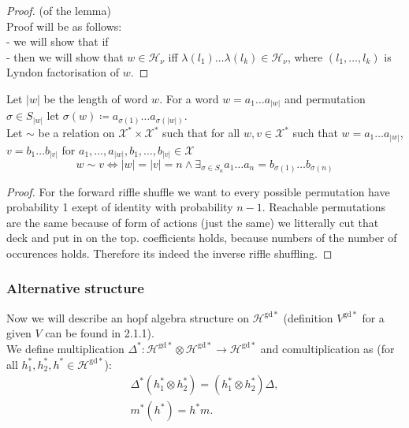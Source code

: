 \documentclass[a4paper]{article}
\newcommand{\gdd}[1]{#1^{\mathrm{gd}*}}
\begin{document}
\begin{proof} (of the lemma) \\
Proof will be as follows: \\
- we will show that if \\
- then we will show that $w \in \mathcal{H}_\nu$ iff $\lambda(l_1)\dots\lambda(l_k) \in \mathcal{H}_\nu$,
where $(l_1,\dots,l_k)$ is Lyndon factorisation of $w$.
\end{proof}

Let $|w|$ be the length of word $w$. For a word $w = a_1\dots a_{|w|}$ and permutation
$\sigma \in S_{|w|}$ let $\sigma(w) \coloneqq a_{\sigma(1)}\dots a_{\sigma(|w|)}$. \\ Let $\sim$ be
a relation on $\mathcal{X}^* \times \mathcal{X}^*$ such that for all $w, v \in \mathcal{X}^*$ such that $w = a_1\dots a_{|w|}$, $v = b_1\dots b_{|v|}$ for
$a_1,\dots, a_{|w|}, b_1, \dots, b_{|v|} \in \mathcal{X}$
\begin{equation*}
w \sim v \iff |w| = |v| = n \land \exists_{\sigma \in S_n} a_1\dots a_n = b_{\sigma(1)}\dots b_{\sigma(n)}
\end{equation*}

\begin{proof}
For the forward riffle shuffle we want to every possible permutation have probability 1 exept of identity
with probability $n-1$. Reachable permutations are the same because of form of actions (just the same)
we litterally cut that deck and put in on the top. coefficients holds, because numbers of the number of
occurences holds. Therefore its indeed the inverse riffle shuffling.
\end{proof}

\subsubsection{Alternative structure}
\indent Now we will describe an hopf algebra structure on $\mathcal{H}^{\mathrm{gd}*}$
{(definition $\gdd{V}$ for a given $V$ can be found in 2.1.1)}. \\
We define multiplication
$\Delta^* : \mathcal{H}^{\mathrm{gd}*} \otimes \gdd{\mathcal{H}} \to \gdd{\mathcal{H}}$ and
comultiplication
\text{$m^* : \gdd{\mathcal{H}} \to \gdd{\mathcal{H}} \otimes \gdd{\mathcal{H}}$} as
(for all $h_1^*, h_2^*, h^* \in \gdd{\mathcal{H}}$):
\begin{align*}
\Delta^*(h_1^* \otimes h_2^*) = (h_1^* \otimes h_2^*)\Delta, \\
m^*(h^*) = h^*m.
\end{align*}
\end{document}
